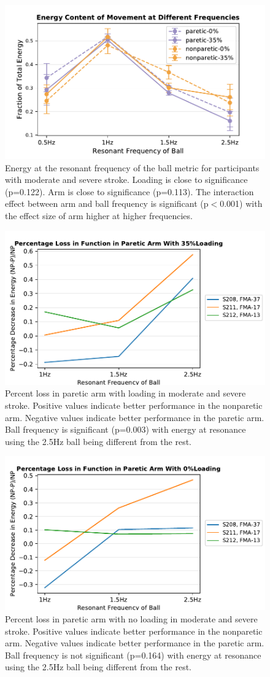 \documentclass{article}
\begin{document}
\begin{figure}[!ht]
     \centering
     \includegraphics[width=0.5\linewidth]{Plots/e_at_res_raw_modsevere.pdf}
	\caption{Energy at the resonant frequency of the ball metric for participants with moderate and severe stroke. Loading is close to significance (p=0.122). Arm is close to significance (p=0.113). The interaction effect between arm and ball frequency is significant (p$<$0.001) with the effect size of arm higher at higher frequencies.}
\end{figure}

\begin{figure}[!ht]
     \centering
     \includegraphics[width=0.5\linewidth]{Plots/pl_SL1_modsevere.pdf}
	\caption{Percent loss in paretic arm with loading in moderate and severe stroke. Positive values indicate better performance in the nonparetic arm. Negative values indicate better performance in the paretic arm. Ball frequency is significant (p=0.003) with energy at resonance using the 2.5Hz ball being different from the rest.}
\end{figure}

\begin{figure}[!ht]
     \centering
     \includegraphics[width=0.5\linewidth]{Plots/pl_SL0_modsevere.pdf}
	\caption{Percent loss in paretic arm with no loading in moderate and severe stroke. Positive values indicate better performance in the nonparetic arm. Negative values indicate better performance in the paretic arm. Ball frequency is not significant (p=0.164) with energy at resonance using the 2.5Hz ball being different from the rest.}
\end{figure}
\end{document}
